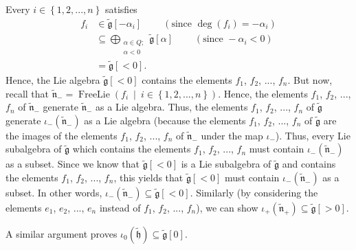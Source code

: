 \documentclass[etingof-lie.tex]{subfiles}
\begin{document}
Every $i\in\left\{  1,2,...,n\right\}  $ satisfies
\begin{align*}
f_{i}  &  \in\widetilde{\mathfrak{g}}\left[  -\alpha_{i}\right]
\ \ \ \ \ \ \ \ \ \ \left(  \text{since }\deg\left(  f_{i}\right)
=-\alpha_{i}\right) \\
&  \subseteq\bigoplus\limits_{\substack{\alpha\in Q;\\\alpha<0}%
}\widetilde{\mathfrak{g}}\left[  \alpha\right]  \ \ \ \ \ \ \ \ \ \ \left(
\text{since }-\alpha_{i}<0\right) \\
&  =\widetilde{\mathfrak{g}}\left[  <0\right]  .
\end{align*}
Hence, the Lie algebra $\widetilde{\mathfrak{g}}\left[  <0\right]  $ contains
the elements $f_{1}$, $f_{2}$, $...$, $f_{n}$. But now, recall that
$\widetilde{\mathfrak{n}}_{-}=\operatorname*{FreeLie}\left(  f_{i}\ \mid
\ i\in\left\{  1,2,...,n\right\}  \right)  $. Hence, the elements $f_{1}$,
$f_{2}$, $...$, $f_{n}$ of $\widetilde{\mathfrak{n}}_{-}$ generate
$\widetilde{\mathfrak{n}}_{-}$ as a Lie algebra. Thus, the elements $f_{1}$,
$f_{2}$, $...$, $f_{n}$ of $\widetilde{\mathfrak{g}}$ generate $\iota
_{-}\left(  \widetilde{\mathfrak{n}}_{-}\right)  $ as a Lie algebra (because
the elements $f_{1}$, $f_{2}$, $...$, $f_{n}$ of $\widetilde{\mathfrak{g}}$
are the images of the elements $f_{1}$, $f_{2}$, $...$, $f_{n}$ of
$\widetilde{\mathfrak{n}}_{-}$ under the map $\iota_{-}$). Thus, every Lie
subalgebra of $\widetilde{\mathfrak{g}}$ which contains the elements $f_{1}$,
$f_{2}$, $...$, $f_{n}$ must contain $\iota_{-}\left(  \widetilde{\mathfrak{n}%
}_{-}\right)  $ as a subset. Since we know that $\widetilde{\mathfrak{g}%
}\left[  <0\right]  $ is a Lie subalgebra of $\widetilde{\mathfrak{g}}$ and
contains the elements $f_{1}$, $f_{2}$, $...$, $f_{n}$, this yields that
$\widetilde{\mathfrak{g}}\left[  <0\right]  $ must contain $\iota_{-}\left(
\widetilde{\mathfrak{n}}_{-}\right)  $ as a subset. In other words, $\iota
_{-}\left(  \widetilde{\mathfrak{n}}_{-}\right)  \subseteq
\widetilde{\mathfrak{g}}\left[  <0\right]  $. Similarly (by considering the
elements $e_{1}$, $e_{2}$, $...$, $e_{n}$ instead of $f_{1}$, $f_{2}$, $...$,
$f_{n}$), we can show $\iota_{+}\left(  \widetilde{\mathfrak{n}}_{+}\right)
\subseteq\widetilde{\mathfrak{g}}\left[  >0\right]  $.

\begin{vershort}
A similar argument proves $\iota_{0}\left(  \widetilde{\mathfrak{h}}\right)
\subseteq\widetilde{\mathfrak{g}}\left[  0\right]  $.
\end{vershort}
\end{document}
